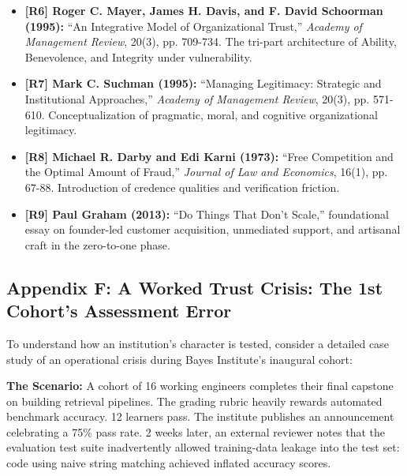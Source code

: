 \begin{itemize}
\item \textbf{[R6] Roger C. Mayer, James H. Davis, and F. David Schoorman (1995):} ``An Integrative Model of Organizational Trust,'' \emph{Academy of Management Review}, 20(3), pp. 709-734. The tri-part architecture of Ability, Benevolence, and Integrity under vulnerability.
\item \textbf{[R7] Mark C. Suchman (1995):} ``Managing Legitimacy: Strategic and Institutional Approaches,'' \emph{Academy of Management Review}, 20(3), pp. 571-610. Conceptualization of pragmatic, moral, and cognitive organizational legitimacy.
\item \textbf{[R8] Michael R. Darby and Edi Karni (1973):} ``Free Competition and the Optimal Amount of Fraud,'' \emph{Journal of Law and Economics}, 16(1), pp. 67-88. Introduction of credence qualities and verification friction.
\item \textbf{[R9] Paul Graham (2013):} ``Do Things That Don't Scale,'' foundational essay on founder-led customer acquisition, unmediated support, and artisanal craft in the zero-to-one phase.
\end{itemize}

\subsection*{Appendix F: A Worked Trust Crisis: The 1st Cohort's Assessment Error}

To understand how an institution's character is tested, consider a detailed case study of an operational crisis during Bayes Institute's inaugural cohort:

\noindent\textbf{The Scenario:} A cohort of 16 working engineers completes their final capstone on building retrieval pipelines. The grading rubric heavily rewards automated benchmark accuracy. 12 learners pass. The institute publishes an announcement celebrating a 75\% pass rate. 2 weeks later, an external reviewer notes that the evaluation test suite inadvertently allowed training-data leakage into the test set: code using naive string matching achieved inflated accuracy scores.

